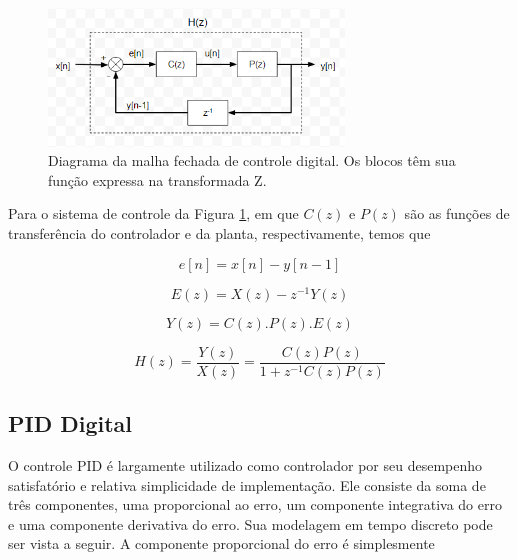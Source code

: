 \begin{figure}[ht]
    \begin{center}
    \includegraphics[width=0.7\textwidth]{figuras/condig.PNG}
    \end{center}
    \caption[Diagrama da malha fechada de controle digital.]{Diagrama da malha fechada de controle digital. Os blocos têm sua função expressa na transformada Z.}
    \label{condig}
\end{figure}

Para o sistema de controle da Figura \ref{condig}, em que $C(z)$ e $P(z)$ são as funções de transferência do controlador e da planta, respectivamente, temos que

\begin{equation}
    \label{eq:cd_2}
    e[n] = x[n] - y[n-1]
\end{equation}

\begin{equation}
    \label{eq:cd_3}
    E(z) = X(z) - z^{-1}Y(z)
\end{equation}

\begin{equation}
    \label{eq:cd_4}
    Y(z) = C(z).P(z).E(z)
\end{equation}

\begin{equation}
    \label{eq:cd_5}
    H(z) = \frac{Y(z)}{X(z)} = \frac{C(z)P(z)}{1+z^{-1}C(z)P(z)}
\end{equation}

\subsection{PID Digital}

O controle \acf{PID} é largamente utilizado como controlador por seu desempenho satisfatório e relativa simplicidade de implementação. Ele consiste da soma de três componentes, uma proporcional ao erro, um componente integrativa do erro e uma componente derivativa do erro. Sua modelagem em tempo discreto pode ser vista a seguir. A componente proporcional do erro é simplesmente

